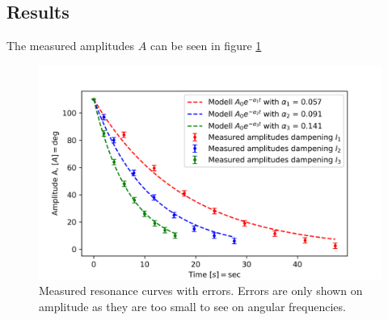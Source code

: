 \subsection{Results}

The measured amplitudes $A$ can be seen in figure \ref{fig::dampening}


\begin{figure} [ht]
	\centering
	\includegraphics[width=\textwidth]{python/damp1.PNG}
	\caption{Measured resonance curves with errors. Errors are only shown on amplitude as they are too small to see on angular frequencies.}
	\label{fig::dampening}
\end{figure}